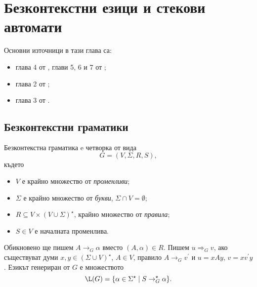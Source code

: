 \chapter{Безконтекстни езици и стекови автомати}

Основни източници в тази глава са:
\begin{itemize}
\item 
  глава 4 от \cite{hopcroft1}, глави 5, 6 и 7 от \cite{hopcroft2};
\item
  глава 2 от \cite{sipser};
\item
  глава 3 от \cite{papadimitriou}.
\end{itemize}

\section{Безконтекстни граматики}
\begin{dfn}
  Безконтекстна граматика e четворка от вида
  \[G = (V,\Sigma,R,S),\]
  където
  \begin{itemize}
  \item
    $V$ е крайно множество от {\em променливи};
  \item
    $\Sigma$ е крайно множество от {\em букви}, $\Sigma \cap V = \emptyset$;
  \item
    $R \subseteq V\times (V\cup\Sigma)^\star$, крайно множество от {\em правила};
  \item
    $S \in V$ е началната променлива. 
  \end{itemize}
  Обикновено ще пишем $A \rightarrow_G \alpha$ вместо $(A,\alpha) \in R$.
  Пишем $u \Rightarrow_G v$, ако съществуват думи $x,y\in (\Sigma\cup V)^\star$, $A\in V$,
  правило $A\rightarrow_G v^\prime$ и $u = xAy$, $v = xv^\prime y$.
  Езикът генериран от $G$ е множеството
  \[\L(G) = \{\alpha\in\Sigma^\star\mid S \rightarrow^\star_G \alpha\}.\]
\end{dfn}

